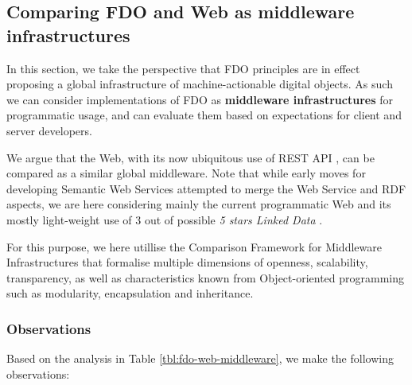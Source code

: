 \documentclass[fleqn,10pt,lineno]{wlpeerjlua}
\begin{document}


\subsection*{Comparing FDO and Web as middleware infrastructures}\label{sec:middleware}

In this section, we take the perspective that FDO principles are in effect proposing a global infrastructure of machine-actionable digital objects. As such we can consider implementations of FDO as \textbf{middleware infrastructures} for programmatic usage, and can evaluate them based on expectations for client and server developers.

We argue that the Web, with its now ubiquitous use of REST API \autocite{fieldingArchitecturalStylesDesign2000a}, can be compared as a similar global middleware. Note that while early moves for developing Semantic Web Services \autocite{fenselSemanticWebServices2011} attempted to merge the Web Service and RDF aspects, we are here considering mainly the current programmatic Web and its mostly light-weight use of 3 out of possible \emph{5 stars Linked Data} \autocite{OpenData}.

For this purpose, we here utillise the Comparison Framework for Middleware Infrastructures \autocite{zarrasComparisonFrameworkMiddleware2004a} that formalise multiple dimensions of openness, scalability, transparency, as well as characteristics known from Object-oriented programming such as modularity, encapsulation and inheritance.

\subsubsection*{Observations}

Based on the analysis in Table \vref{tbl:fdo-web-middleware}, we make the following observations:
\end{document}
